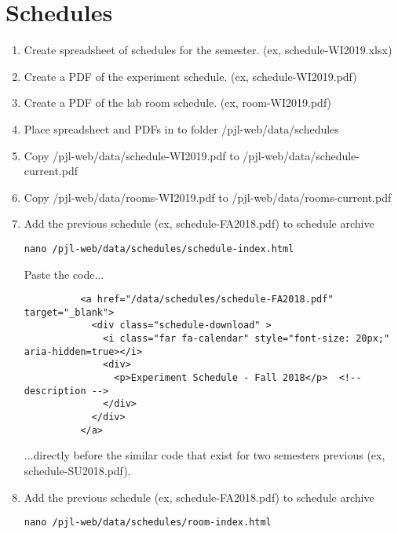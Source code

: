 \documentclass[justified]{LabArx1_5}
\begin{document}
\section{Schedules}\label{sec:schedule}

\begin{enumerate}

\item Create spreadsheet of schedules for the semester. (ex, schedule-WI2019.xlsx)

\item Create a PDF of the experiment schedule. (ex, schedule-WI2019.pdf)

\item Create a PDF of the lab room schedule. (ex, room-WI2019.pdf)

\item Place spreadsheet and PDFs in to folder /pjl-web/data/schedules

\item Copy /pjl-web/data/schedule-WI2019.pdf to /pjl-web/data/schedule-current.pdf

\item Copy /pjl-web/data/rooms-WI2019.pdf to /pjl-web/data/rooms-current.pdf

\item Add the previous schedule (ex, schedule-FA2018.pdf) to schedule archive

\begin{lstlisting}
nano /pjl-web/data/schedules/schedule-index.html       
\end{lstlisting}

Paste the code...
\begin{lstlisting}
          <a href="/data/schedules/schedule-FA2018.pdf" target="_blank">
            <div class="schedule-download" >
              <i class="far fa-calendar" style="font-size: 20px;" aria-hidden=true></i> 
              <div>
                <p>Experiment Schedule - Fall 2018</p>  <!-- description -->
              </div>
            </div>
          </a>
\end{lstlisting}

...directly before the similar code that exist for two semesters previous (ex, schedule-SU2018.pdf).

\item Add the previous schedule (ex, schedule-FA2018.pdf) to schedule archive

\begin{lstlisting}
nano /pjl-web/data/schedules/room-index.html       
\end{lstlisting}


\end{enumerate}
\end{document}
